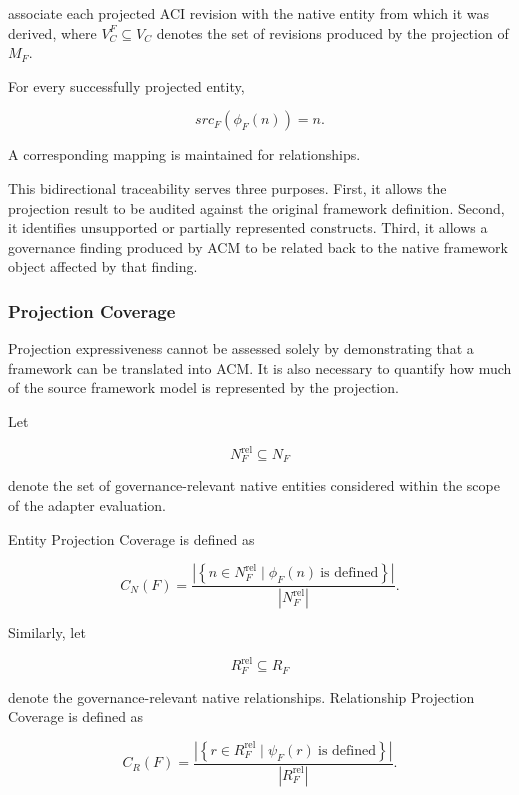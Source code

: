 \documentclass[10pt]{article}
\begin{document}
associate each projected ACI revision with the native entity from which it was
derived, where $V_C^{F}\subseteq V_C$ denotes the set of revisions produced by
the projection of $M_F$.

For every successfully projected entity,

\begin{equation}
	src_F(\phi_F(n))=n.
	\label{eq:projection_traceability}
\end{equation}

A corresponding mapping is maintained for relationships.

This bidirectional traceability serves three purposes. First, it allows the
projection result to be audited against the original framework definition.
Second, it identifies unsupported or partially represented constructs. Third,
it allows a governance finding produced by ACM to be related back to the native
framework object affected by that finding.

\subsubsection{Projection Coverage}

Projection expressiveness cannot be assessed solely by demonstrating that a
framework can be translated into ACM. It is also necessary to quantify how much
of the source framework model is represented by the projection.

Let

\[
N_F^{\mathrm{rel}}
\subseteq
N_F
\]

denote the set of governance-relevant native entities considered within the
scope of the adapter evaluation.

Entity Projection Coverage is defined as

\begin{equation}
	\label{eq:entity_projection_cover}
C_N(F)
=
\frac{
	\left|
	\left\{
	n\in N_F^{\mathrm{rel}}
	\mid
	\phi_F(n)\ \text{is defined}
	\right\}
	\right|
}{
	|N_F^{\mathrm{rel}}|
}.
\end{equation}

Similarly, let

\[
R_F^{\mathrm{rel}}
\subseteq
R_F
\]

denote the governance-relevant native relationships. Relationship Projection
Coverage is defined as

\begin{equation}
C_R(F)
=
\frac{
	\left|
	\left\{
	r\in R_F^{\mathrm{rel}}
	\mid
	\psi_F(r)\ \text{is defined}
	\right\}
	\right|
}{
	|R_F^{\mathrm{rel}}|
}.
\label{eq:relationship_projection_cover}
\end{equation}
\end{document}
